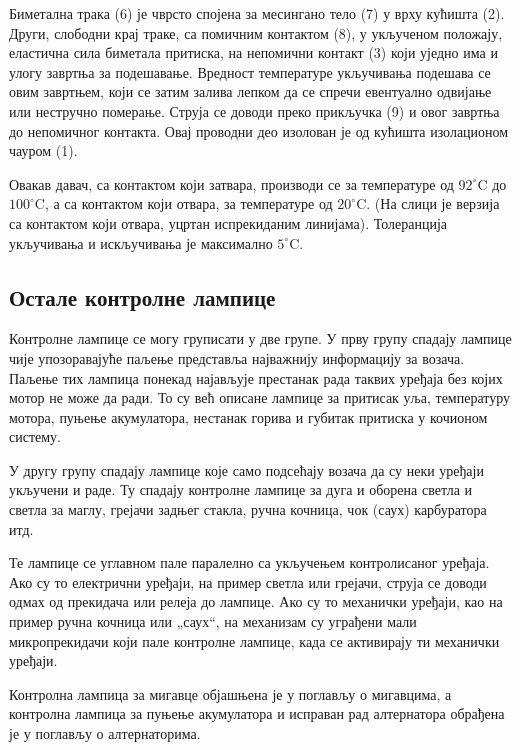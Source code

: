\documentclass[12pt,a4paper]{report}
\begin{document}
Биметална трака (6) је чврсто спојена за месингано тело (7) у врху кућишта (2). Други, слободни крај траке, са помичним контактом (8), у укљученом положају, еластична сила биметала притиска, на непомични контакт (3) који уједно има и улогу завртња за подешавање. Вредност температуре укључивања подешава се овим завртњем, који се затим залива лепком да се спречи евентуално одвијање или нестручно померање. Струја се доводи преко прикључка (9) и овог завртња до непомичног контакта. Овај проводни део изолован је од кућишта изолационом чауром (1).

Овакав давач, са контактом који затвара, производи се за температуре од $92^\circ\text{C}$ до $100^\circ\text{C}$, а са контактом који отвара, за температуре од $20^\circ\text{C}$. (На слици је верзија са контактом који отвара, уцртан испрекиданим линијама). Толеранција укључивања и искључивања је максимално $5^\circ\text{C}$.

\subsection{Остале контролне лампице}

Контролне лампице се могу груписати у две групе. У прву групу спадају лампице чије упозоравајуће паљење представља најважнију информацију за возача. Паљење тих лампица понекад најављује престанак рада таквих уређаја без којих мотор не може да ради. То су већ описане лампице за притисак уља, температуру мотора, пуњење акумулатора, нестанак горива и губитак притиска у кочионом систему.

У другу групу спадају лампице које само подсећају возача да су неки уређаји укључени и раде. Ту спадају контролне лампице за дуга и оборена светла и светла за маглу, грејачи задњег стакла, ручна кочница, чок (саух) карбуратора итд.

Те лампице се углавном пале паралелно са укључењем контролисаног уређаја. Ако су то електрични уређаји, на пример светла или грејачи, струја се доводи одмах од прекидача или релеја до лампице. Ако су то механички уређаји, као на пример ручна кочница или „саух“, на механизам су уграђени мали микропрекидачи који пале контролне лампице, када се активирају ти механички уређаји.

Контролна лампица за мигавце објашњена је у поглављу о мигавцима, а контролна лампица за пуњење акумулатора и исправан рад алтернатора обрађена је у поглављу о алтернаторима.
\end{document}
